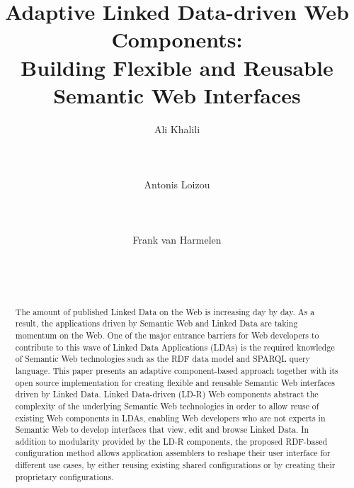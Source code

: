 \documentclass{acm_proc_article-sp}
\begin{document}
\title{Adaptive Linked Data-driven Web Components:\\ Building Flexible and Reusable Semantic Web Interfaces}
\subtitle{}

\author{
\alignauthor
Ali Khalili\\
       \\
       \\
       \\
\alignauthor
Antonis Loizou\\
       \\
       \\
       \\
\alignauthor
Frank van Harmelen\\
       \\
       \\
       \\
}


\maketitle
\begin{abstract}
The amount of published Linked Data on the Web is increasing day by day.
As a result, the applications driven by Semantic Web and Linked Data are taking momentum on the Web.
One of the major entrance barriers for Web developers to contribute to this wave of Linked Data Applications (LDAs) is the required knowledge of Semantic Web technologies such as the RDF data model and SPARQL query language.
This paper presents an adaptive component-based approach together with its open source implementation for creating flexible and reusable Semantic Web interfaces driven by Linked Data.
Linked Data-driven (LD-R) Web components abstract the complexity of the underlying Semantic Web technologies in order to allow reuse of existing Web components in LDAs, enabling Web developers who are not experts in Semantic Web to develop interfaces that view, edit and browse Linked Data.
In addition to modularity provided by the LD-R components, the proposed RDF-based configuration method allows application assemblers to reshape their user interface for different use cases, by either reusing existing shared configurations or by creating their proprietary configurations.

\end{abstract}
\end{document}
